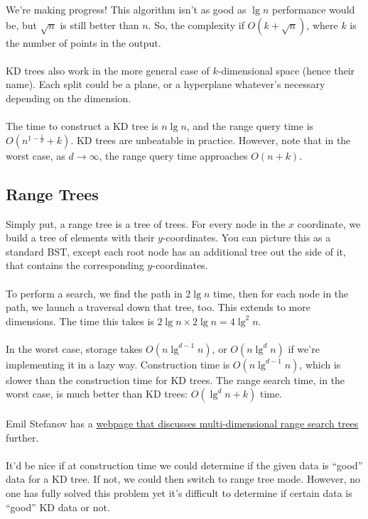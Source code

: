 \documentclass[]{article}
\theoremstyle{definition}
\begin{document}
			We're making progress! This algorithm isn't as good as $\lg n$ performance would be, but $\sqrt{n}$ is still better than $n$. So, the complexity if $O(k + \sqrt{n})$, where $k$ is the number of points in the output.
			\\ \\
			KD trees also work in the more general case of $k$-dimensional space (hence their name). Each split could be a plane, or a hyperplane \textendash{} whatever's necessary depending on the dimension.
			\\ \\
			The time to construct a KD tree is $n \lg n$, and the range query time is $O(n^{1 - \frac{1}{d}} + k)$. KD trees are unbeatable in practice. However, note that in the worst case, as $d \to \infty$, the range query time approaches $O(n + k)$.

		\subsection{Range Trees}
			Simply put, a range tree is a tree of trees. For every node in the $x$ coordinate, we build a tree of elements with their $y$-coordinates. You can picture this as a standard BST, except each root node has an additional tree out the side of it, that contains the corresponding $y$-coordinates.
			\\ \\
			To perform a search, we find the path in $2 \lg n$ time, then for each node in the path, we launch a traversal down that tree, too. This extends to more dimensions. The time this takes is $2 \lg n \times 2 \lg n = 4 \lg^2 n$.
			\\ \\
			In the worst case, storage takes $O(n \lg^{d - 1} n)$, or $O(n \lg^d n)$ if we're implementing it in a lazy way. Construction time is $O(n \lg^{d - 1} n)$, which is slower than the construction time for KD trees. The range search time, in the worst case, is much better than KD trees: $O(\lg^d n + k)$ time.
			\\ \\
			Emil Stefanov has a \href{http://www.emilstefanov.net/Projects/RangeSearchTree.aspx}{webpage that discusses multi-dimensional range search trees} further.
			\\ \\
			It'd be nice if at construction time we could determine if the given data is ``good'' data for a KD tree. If not, we could then switch to range tree mode. However, no one has fully solved this problem yet \textendash{} it's difficult to determine if certain data is ``good'' KD data or not.
\end{document}
